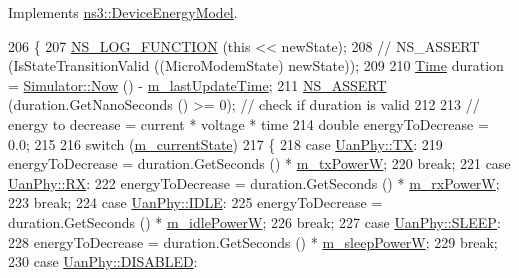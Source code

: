 Implements \hyperlink{classns3_1_1DeviceEnergyModel_a332be7863f3e8258743811077dde7f39}{ns3\+::\+Device\+Energy\+Model}.


\begin{DoxyCode}
206 \{
207   \hyperlink{log-macros-disabled_8h_a90b90d5bad1f39cb1b64923ea94c0761}{NS\_LOG\_FUNCTION} (\textcolor{keyword}{this} << newState);
208   \textcolor{comment}{// NS\_ASSERT (IsStateTransitionValid ((MicroModemState) newState));}
209 
210   \hyperlink{namespacens3_1_1TracedValueCallback_a7ffd3e7c142ffe7c8a1d2db9b8de38ec}{Time} duration = \hyperlink{classns3_1_1Simulator_ac3178fa975b419f7875e7105be122800}{Simulator::Now} () - \hyperlink{classns3_1_1AcousticModemEnergyModel_a2f87b6c71b37c55d369b0fffc8818765}{m\_lastUpdateTime};
211   \hyperlink{assert_8h_a6dccdb0de9b252f60088ce281c49d052}{NS\_ASSERT} (duration.GetNanoSeconds () >= 0); \textcolor{comment}{// check if duration is valid}
212 
213   \textcolor{comment}{// energy to decrease = current * voltage * time}
214   \textcolor{keywordtype}{double} energyToDecrease = 0.0;
215 
216   \textcolor{keywordflow}{switch} (\hyperlink{classns3_1_1AcousticModemEnergyModel_a7fa8d6ead4a746d2afac40f060921af0}{m\_currentState})
217     \{
218     \textcolor{keywordflow}{case} \hyperlink{classns3_1_1UanPhy_afc5e3b6b00589131e4a56ececd42bf9faab8bf12eabef757b7e77f59f71ff102c}{UanPhy::TX}:
219       energyToDecrease = duration.GetSeconds () * \hyperlink{classns3_1_1AcousticModemEnergyModel_a39960d270366b5ff4a83d32c077b44a2}{m\_txPowerW};
220       \textcolor{keywordflow}{break};
221     \textcolor{keywordflow}{case} \hyperlink{classns3_1_1UanPhy_afc5e3b6b00589131e4a56ececd42bf9fa35e2631d9c2bed2205eaa7f4da74dda8}{UanPhy::RX}:
222       energyToDecrease = duration.GetSeconds () * \hyperlink{classns3_1_1AcousticModemEnergyModel_a1d81af5908e48e1e9c995306ab19d9bd}{m\_rxPowerW};
223       \textcolor{keywordflow}{break};
224     \textcolor{keywordflow}{case} \hyperlink{classns3_1_1UanPhy_afc5e3b6b00589131e4a56ececd42bf9fa6143a554e834f71f498e5f781682d347}{UanPhy::IDLE}:
225       energyToDecrease = duration.GetSeconds () * \hyperlink{classns3_1_1AcousticModemEnergyModel_a2a4d8c7f2c572c056086ea37d087ff42}{m\_idlePowerW};
226       \textcolor{keywordflow}{break};
227     \textcolor{keywordflow}{case} \hyperlink{classns3_1_1UanPhy_afc5e3b6b00589131e4a56ececd42bf9fa4992fce9c378d8a56ef87ca363d9a417}{UanPhy::SLEEP}:
228       energyToDecrease = duration.GetSeconds () * \hyperlink{classns3_1_1AcousticModemEnergyModel_ab65c0e46edd757bd1159ed7fddc1336a}{m\_sleepPowerW};
229       \textcolor{keywordflow}{break};
230     \textcolor{keywordflow}{case} \hyperlink{classns3_1_1UanPhy_afc5e3b6b00589131e4a56ececd42bf9faa9eccd74ad50233a8402ed255e273361}{UanPhy::DISABLED}:

\end{DoxyCode}
